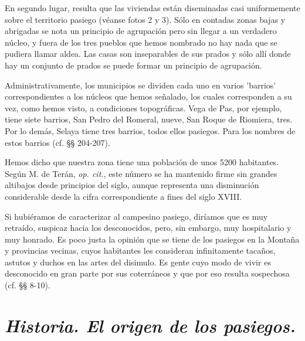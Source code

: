 En segundo lugar, resulta que las viviendas están diseminadas casi uniformemente sobre el territorio pasiego (véanse fotos 2 y 3). Sólo en contadas zonas bajas y abrigadas se nota un principio de agrupación pero sin llegar a un verdadero núcleo, y fuera de los tres pueblos que
hemos nombrado no hay nada que se pudiera llamar aldea. Las casas son inseparables de sus prados y sólo allí donde hay un conjunto de prados se puede formar un principio de agrupación.

Administrativamente, los municipios se dividen cada uno en varios 'barrios' correspondientes a los núcleos que hemos señalado, los cuales corresponden a su vez, como hemos visto, a condiciones topográficas. Vega de Pas, por ejemplo, tiene siete barrios, San Pedro del Romeral,
nueve, San Roque de Riomiera, tres. Por lo demás, Selaya tiene tres barrios, todos ellos pasiegos. Para los nombres de estos barrios (cf. §§ 204-207).

Hemos dicho que nuestra zona tiene una población de unos 5200 habitantes. Según M. de Terán, \emph{op. cit.}, este número se ha mantenido firme sin grandes altibajos desde principios del siglo, aunque representa una disminución considerable desde la cifra correspondiente a fines del
siglo XVIII.

Si hubiéramos de caracterizar al campesino pasiego, diríamos que es muy retraído, suspicaz hacia los desconocidos, pero, sin embargo, muy hospitalario y muy honrado. Es poco justa la opinión que se tiene de los pasiegos en la Montaña y provincias vecinas, cuyos habitantes les consideran infinitamente tacaños, astutos y duchos en las artes del disimulo. Es gente cuyo modo de vivir es desconocido en gran parte por sus coterráneos y que por eso resulta sospechosa (cf. §§ 8-10).

\section{\emph{Historia. El origen de los pasiegos.}}

